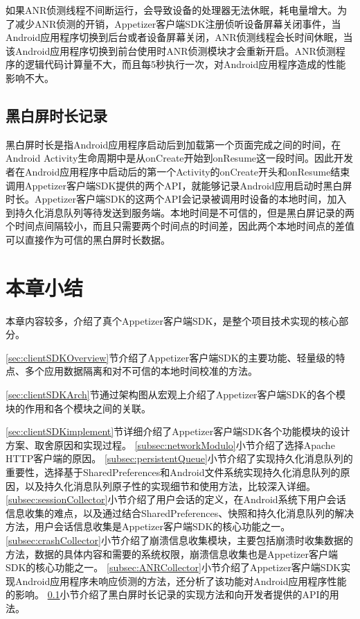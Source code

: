 如果ANR侦测线程不间断运行，会导致设备的处理器无法休眠，耗电量增大。为了减少ANR侦测的开销，Appetizer客户端SDK注册侦听设备屏幕关闭事件，当Android应用程序切换到后台或者设备屏幕关闭，ANR侦测线程会长时间休眠，当该Android应用程序切换到前台使用时ANR侦测模块才会重新开启。ANR侦测程序的逻辑代码计算量不大，而且每5秒执行一次，对Android应用程序造成的性能影响不大。

\subsection{黑白屏时长记录}
\label{subsec:blackWhiteCollector}

黑白屏时长是指Android应用程序启动后到加载第一个页面完成之间的时间，在Android Activity生命周期中是从onCreate开始到onResume这一段时间。因此开发者在Android应用程序中启动后的第一个Activity的onCreate开头和onResume结束调用Appetizer客户端SDK提供的两个API，就能够记录Android应用启动时黑白屏时长。Appetizer客户端SDK的这两个API会记录被调用时设备的本地时间，加入到持久化消息队列等待发送到服务端。本地时间是不可信的，但是黑白屏记录的两个时间点间隔较小，而且只需要两个时间点的时间差，因此两个本地时间点的差值可以直接作为可信的黑白屏时长数据。

\section{本章小结}

本章内容较多，介绍了真个Appetizer客户端SDK，是整个项目技术实现的核心部分。

\ref{sec:clientSDKOverview}节介绍了Appetizer客户端SDK的主要功能、轻量级的特点、多个应用数据隔离和对不可信的本地时间校准的方法。

\ref{sec:clientSDKArch}节通过架构图从宏观上介绍了Appetizer客户端SDK的各个模块的作用和各个模块之间的关联。

\ref{sec:clientSDKimplement}节详细介绍了Appetizer客户端SDK各个功能模块的设计方案、取舍原因和实现过程。
\ref{subsec:networkModulo}小节介绍了选择Apache HTTP客户端的原因。
\ref{subsec:persistentQueue}小节介绍了实现持久化消息队列的重要性，选择基于SharedPreferences和Android文件系统实现持久化消息队列的原因，以及持久化消息队列原子性的实现细节和使用方法，比较深入详细。
\ref{subsec:sessionCollector}小节介绍了用户会话的定义，在Android系统下用户会话信息收集的难点，以及通过结合SharedPreferences、快照和持久化消息队列的解决方法，用户会话信息收集是Appetizer客户端SDK的核心功能之一。
\ref{subsec:crashCollector}小节介绍了崩溃信息收集模块，主要包括崩溃时收集数据的方法，数据的具体内容和需要的系统权限，崩溃信息收集也是Appetizer客户端SDK的核心功能之一。
\ref{subsec:ANRCollector}小节介绍了Appetizer客户端SDK实现Android应用程序未响应侦测的方法，还分析了该功能对Android应用程序性能的影响。
\ref{subsec:blackWhiteCollector}小节介绍了黑白屏时长记录的实现方法和向开发者提供的API的用法。